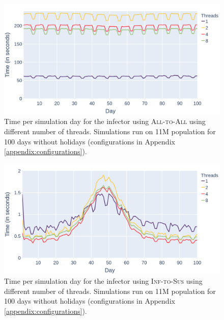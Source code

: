 \begin{figure}
    \centering
    \includegraphics[width=\linewidth]{3 - Stride/fig/basis_all_parallel_infector.png}
    \caption{Time per simulation day for the infector using \textsc{All-to-All} using different number of threads. Simulations run on 11M population for 100 days without holidays (configurations in Appendix \ref{appendix:configurations}).}
    \label{fig:basis_all_parallel_infector}
\end{figure}

\begin{figure}
    \centering
    \includegraphics[width=\linewidth]{3 - Stride/fig/basis_opt_parallel_infector.png}
    \caption{Time per simulation day for the infector using \textsc{Inf-to-Sus} using different number of threads. Simulations run on 11M population for 100 days without holidays (configurations in Appendix \ref{appendix:configurations}).}
    \label{fig:basis_opt_parallel_infector}
\end{figure}

